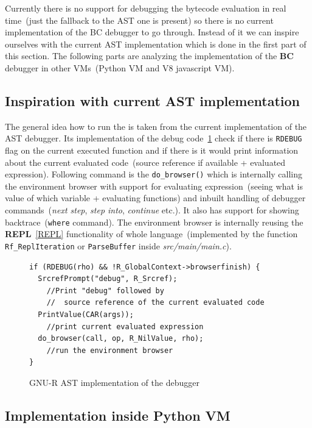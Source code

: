 \documentclass[thesis=M,english]{FITthesis}[2018/10/20]
\newcommand{\code}[1]{\texttt{#1}}
\begin{document}
Currently there is no support for debugging the bytecode evaluation in real time~(just the fallback to the AST one is present) so there is no current implementation of the BC debugger to go through. Instead of it we can inspire ourselves with the current AST implementation which is done in the first part of this section. The following parts are analyzing the implementation of the \textbf{BC} debugger in other VMs~(Python VM and V8 javascript VM).

\subsection{Inspiration with current AST implementation}

The general idea how to run the is taken from the current implementation of the AST debugger. Its implementation of the debug code~\ref{fig:ast-implementation-of-debugger} check if there is \code{RDEBUG} flag on the current executed function and if there is it would print information about the current evaluated code~(source reference if available + evaluated expression). Following command is the \code{do{\_}browser()} which is internally calling the environment browser with support for evaluating expression~(seeing what is value of which variable + evaluating functions) and inbuilt handling of debugger commands~(\textit{next step}, \textit{step into}, \textit{continue} etc.). It also has support for showing backtrace~(\code{where} command). The environment browser is internally reusing the \textbf{REPL}~\ref{REPL} functionality of whole language~(implemented by the function \code{Rf{\_}ReplIteration} or \code{ParseBuffer} inside \textit{src/main/main.c}).

\begin{figure}[!h]
\begin{lstlisting}
if (RDEBUG(rho) && !R_GlobalContext->browserfinish) {
  SrcrefPrompt("debug", R_Srcref);
    //Print "debug" followed by
    //  source reference of the current evaluated code
  PrintValue(CAR(args));
  	//print current evaluated expression
  do_browser(call, op, R_NilValue, rho);
  	//run the environment browser
}
\end{lstlisting}
	\caption{GNU-R AST implementation of the debugger}\label{fig:ast-implementation-of-debugger}
\end{figure}

\subsection{Implementation inside Python VM}\label{bcdebug-implementation-in-python}
\end{document}
